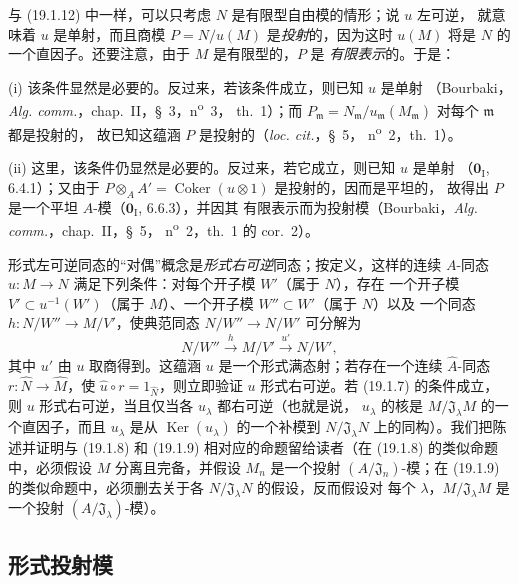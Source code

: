 与 (19.1.12) 中一样，可以只考虑 $N$ 是有限型自由模的情形；说 $u$ 左可逆，
就意味着 $u$ 是单射，而且商模 $P=N/u(M)$ 是\emph{投射}的，因为这时
$u(M)$ 将是 $N$ 的一个直因子。还要注意，由于 $M$ 是有限型的，$P$ 是
\emph{有限表示}的。于是：

(i) 该条件显然是必要的。反过来，若该条件成立，则已知 $u$ 是单射
（Bourbaki，\emph{Alg. comm.}，chap.~II，§~3，n\textsuperscript{o}~3，
th.~1）；而
$P_{\mathfrak m}=N_{\mathfrak m}/u_{\mathfrak m}(M_{\mathfrak m})$ 对每个
$\mathfrak m$ 都是投射的，
故已知这蕴涵 $P$ 是投射的（\emph{loc. cit.}，§~5，
n\textsuperscript{o}~2，th.~1）。

(ii) 这里，该条件仍显然是必要的。反过来，若它成立，则已知 $u$ 是单射
（$\mathbf{0}_{\mathrm I}$, 6.4.1）；又由于
$P\otimes_AA'=\operatorname{Coker}(u\otimes1)$ 是投射的，因而是平坦的，
故得出 $P$ 是一个平坦 $A$-模（$\mathbf{0}_{\mathrm I}$, 6.6.3），并因其
有限表示而为投射模（Bourbaki，\emph{Alg. comm.}，chap.~II，§~5，
n\textsuperscript{o}~2，th.~1 的 cor.~2）。


\begin{remark}[19.1.15]
\label{0.19.1.15-fr}
形式左可逆同态的“对偶”概念是\emph{形式右可逆}同态；按定义，这样的连续
$A$-同态 $u:M\to N$ 满足下列条件：对每个开子模 $W'$（属于 $N$），存在
一个开子模 $V'\subset u^{-1}(W')$（属于 $M$）、一个开子模
$W''\subset W'$（属于 $N$）以及
一个同态 $h:N/W''\to M/V'$，使典范同态 $N/W''\to N/W'$ 可分解为
\[
  N/W''\xrightarrow{h}M/V'\xrightarrow{u'}N/W',
\]
其中 $u'$ 由 $u$ 取商得到。这蕴涵 $u$ 是一个形式满态射；若存在一个连续
$\widehat A$-同态 $r:\widehat N\to\widehat M$，使
$\widehat u\circ r=1_{\widehat N}$，则立即验证 $u$ 形式右可逆。若 (19.1.7)
的条件成立，则 $u$ 形式右可逆，当且仅当各 $u_\lambda$ 都右可逆（也就是说，
$u_\lambda$ 的核是 $M/\mathfrak J_\lambda M$ 的一个直因子，而且
$u_\lambda$ 是从 $\operatorname{Ker}(u_\lambda)$ 的一个补模到
$N/\mathfrak J_\lambda N$ 上的同构）。我们把陈述并证明与 (19.1.8) 和
(19.1.9) 相对应的命题留给读者（在 (19.1.8) 的类似命题中，必须假设 $M$
分离且完备，并假设 $M_n$ 是一个投射 $(A/\mathfrak J_n)$-模；在 (19.1.9)
的类似命题中，必须删去关于各 $N/\mathfrak J_\lambda N$ 的假设，反而假设对
每个 $\lambda$，$M/\mathfrak J_\lambda M$ 是一个投射
$(A/\mathfrak J_\lambda)$-模）。
\end{remark}

\subsection{形式投射模}
\label{subsection:0.19.2-fr}

